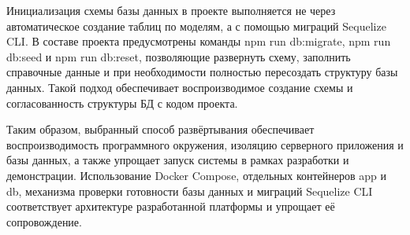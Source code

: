 Инициализация схемы базы данных в проекте выполняется не через автоматическое создание таблиц по моделям, а с помощью миграций Sequelize CLI. В составе проекта предусмотрены команды npm run db:migrate, npm run db:seed и npm run db:reset, позволяющие развернуть схему, заполнить справочные данные и при необходимости полностью пересоздать структуру базы данных. Такой подход обеспечивает воспроизводимое создание схемы и согласованность структуры БД с кодом проекта.

Таким образом, выбранный способ развёртывания обеспечивает воспроизводимость программного окружения, изоляцию серверного приложения и базы данных, а также упрощает запуск системы в рамках разработки и демонстрации. Использование Docker Compose, отдельных контейнеров app и db, механизма проверки готовности базы данных и миграций Sequelize CLI соответствует архитектуре разработанной платформы и упрощает её сопровождение.

